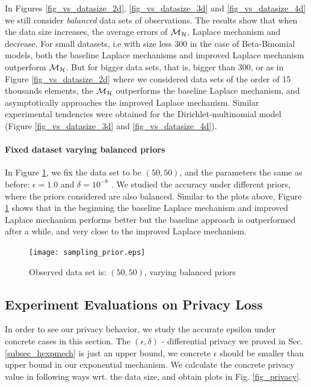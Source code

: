 \documentclass{article}
\begin{document}


In Figures \ref{fig_vs_datasize_2d}, \ref{fig_vs_datasize_3d} and \ref{fig_vs_datasize_4d} we still consider \emph{balanced} data sets
of observations. The results show that when the data size increases, the average errors of
$\mathcal{M}_{\mathcal{H}}$, Laplace mechanism and decrease. For small datasets,
i.e with size less $300$ in the case of Beta-Binomial models,
both the baseline Laplace mechanisms and improved Laplace mechanism outperform $\mathcal{M}_{\mathcal{H}}$.
But for bigger data sets, that is, bigger than $300$, or as in Figure \ref{fig_vs_datasize_2d} where
we considered data sets of the order of 15 thousands elements,
the $\mathcal{M}_{\mathcal{H}}$ outperforms the baseline Laplace mechanism, and asymptotically approaches the improved Laplace mechanism.
Similar experimental tendencies were obtained for the Dirichlet-multinomial model (Figure \ref{fig_vs_datasize_3d} and \ref{fig_vs_datasize_4d}).




\paragraph{Fixed dataset varying balanced priors}
\label{subsubsec_vs_prior}
In Figure \ref{fig_vs_prior}, we fix the data set to be $(50,50)$, and the parameters the same as before: $\epsilon = 1.0$ and $\delta = 10^{-8}$ . We studied the accuracy under different priors, where the priors considered  are also balanced.
Similar to the plots above, Figure \ref{fig_vs_prior} shows that in the beginning the baseline Laplace mechanism and improved Laplace mechanism performs better but the baseline approach is outperformed after a while, and very close to the improved Laplace mechanism.
\begin{figure}
\centering
\texttt{[image: sampling\_prior.eps]}
\caption{Observed data set is: $(50,50)$, varying balanced priors}
\label{fig_vs_prior}
\end{figure}

\subsection{Experiment Evaluations on Privacy Loss}
\label{subsec_experiment_privacy}
In order to see our privacy behavior, we study the accurate epsilon under concrete cases in this section. The $(\epsilon, \delta)$ - differential privacy we proved in Sec. \ref{subsec_hexpmech} is just an upper bound, we concrete $\epsilon$ should be smaller than upper bound in our exponential mechanism. We calculate the concrete privacy value in following ways wrt. the data size, and obtain plots in Fig. \ref{fig_privacy}.
\end{document}
